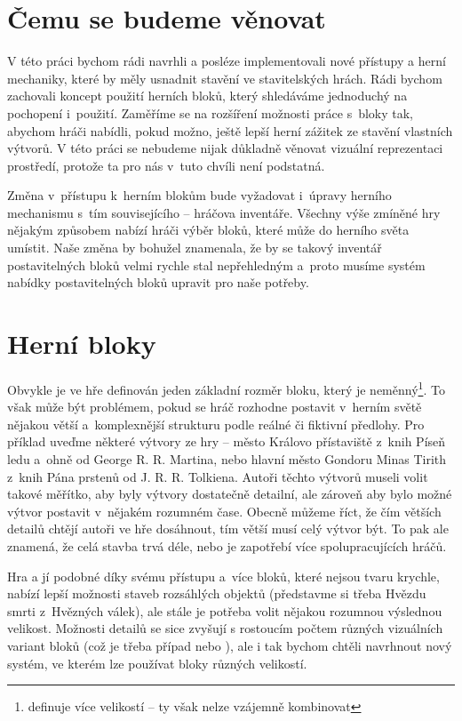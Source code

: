 \section{Čemu se budeme věnovat}
V této práci bychom rádi navrhli a posléze implementovali nové přístupy a herní mechaniky, které by měly usnadnit stavění ve stavitelských hrách. Rádi bychom zachovali koncept použití herních bloků, který shledáváme jednoduchý na pochopení i~použití. Zaměříme se na rozšíření možnosti práce s~bloky tak, abychom hráči nabídli, pokud možno, ještě lepší herní zážitek ze stavění vlastních výtvorů. V této práci se nebudeme nijak důkladně věnovat vizuální reprezentaci prostředí, protože ta pro nás v~tuto chvíli není podstatná.

Změna v~přístupu k~herním blokům bude vyžadovat i~úpravy herního mechanismu s~tím souvisejícího -- hráčova inventáře. Všechny výše zmíněné hry nějakým způsobem nabízí hráči výběr bloků, které může do herního světa umístit. Naše změna by bohužel znamenala, že by se takový inventář postavitelných bloků velmi rychle stal nepřehledným a~proto musíme systém nabídky postavitelných bloků upravit pro naše potřeby.


\section{Herní bloky}
Obvykle je ve hře definován jeden základní rozměr bloku, který je neměnný\footnote{\SE{} definuje více velikostí -- ty však nelze vzájemně kombinovat}. To však může být problémem, pokud se hráč rozhodne postavit v~herním světě nějakou větší a~komplexnější strukturu podle reálné či fiktivní předlohy. Pro příklad uveďme některé výtvory ze hry \MC{} -- město Královo přístaviště z~knih Píseň ledu a~ohně od George R. R. Martina, nebo hlavní město Gondoru Minas Tirith z~knih Pána prstenů od J. R. R. Tolkiena. Autoři těchto výtvorů museli volit takové měřítko, aby byly výtvory dostatečně detailní, ale zároveň aby bylo možné výtvor postavit v~nějakém rozumném čase. Obecně můžeme říct, že čím větších detailů chtějí autoři ve hře \MC{} dosáhnout, tím větší musí celý výtvor být. To pak ale znamená, že celá stavba trvá déle, nebo je zapotřebí více spolupracujících hráčů. 

Hra \SE{} a jí podobné díky svému přístupu a~více bloků, které nejsou tvaru krychle, nabízí lepší možnosti staveb rozsáhlých objektů (představme si třeba Hvězdu smrti z~Hvězných válek), ale stále je potřeba volit nějakou rozumnou výslednou velikost. Možnosti detailů se sice zvyšují s rostoucím počtem různých vizuálních variant bloků (což je třeba případ \SE{} nebo \NI{}), ale i tak bychom chtěli navrhnout nový systém, ve kterém lze používat bloky různých velikostí.




